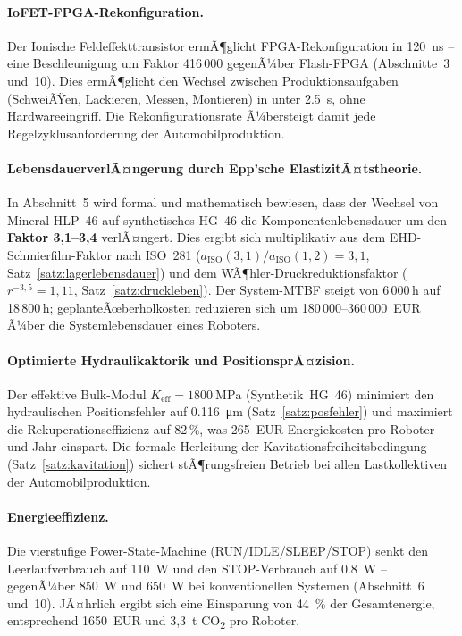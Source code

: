 ﻿\documentclass[a4paper,12pt]{scrreprt}
\theoremstyle{definition}
\begin{document}
\paragraph{IoFET-FPGA-Rekonfiguration.}
Der Ionische Feldeffekttransistor ermÃ¶glicht FPGA-Rekonfiguration
in \SI{120}{\nano\second} -- eine Beschleunigung um Faktor 416\,000
gegenÃ¼ber Flash-FPGA (Abschnitte~3 und~10). Dies ermÃ¶glicht den
Wechsel zwischen Produktionsaufgaben (SchweiÃŸen, Lackieren, Messen,
Montieren) in unter \SI{2.5}{\second}, ohne Hardwareeingriff.
Die Rekonfigurationsrate Ã¼bersteigt damit jede Regelzyklusanforderung
der Automobilproduktion.

\paragraph{LebensdauerverlÃ¤ngerung durch Epp'sche ElastizitÃ¤tstheorie.}
In Abschnitt~5 wird formal und mathematisch bewiesen, dass der Wechsel
von Mineral-HLP~46 auf synthetisches HG~46 die Komponentenlebensdauer
um den \textbf{Faktor 3{,}1--3{,}4} verlÃ¤ngert. Dies ergibt sich
multiplikativ aus dem EHD-Schmierfilm-Faktor nach ISO~281
($a_{\text{ISO}}(3{,}1)/a_{\text{ISO}}(1{,}2) = 3{,}1$,
Satz~\ref{satz:lagerlebensdauer}) und dem WÃ¶hler-Druckreduktionsfaktor
($r^{-3{,}5} = 1{,}11$, Satz~\ref{satz:druckleben}).
Der System-MTBF steigt von 6\,000\,h auf 18\,800\,h;
geplanteÃœberholkosten reduzieren sich um 180\,000--360\,000~EUR
Ã¼ber die Systemlebensdauer eines Roboters.

\paragraph{Optimierte Hydraulikaktorik und PositionsprÃ¤zision.}
Der effektive Bulk-Modul $K_{\text{eff}} = \SI{1800}{\mega\pascal}$
(Synthetik~HG~46) minimiert den hydraulischen Positionsfehler
auf \SI{0.116}{\micro\meter} (Satz~\ref{satz:posfehler}) und
maximiert die Rekuperationseffizienz auf 82\,\%, was 265~EUR
Energiekosten pro Roboter und Jahr einspart.
Die formale Herleitung der Kavitationsfreiheitsbedingung
(Satz~\ref{satz:kavitation}) sichert stÃ¶rungsfreien Betrieb
bei allen Lastkollektiven der Automobilproduktion.

\paragraph{Energieeffizienz.}
Die vierstufige Power-State-Machine (RUN/IDLE/SLEEP/STOP) senkt
den Leerlaufverbrauch auf \SI{110}{\watt} und den STOP-Verbrauch
auf \SI{0.8}{\watt} -- gegenÃ¼ber \SI{850}{\watt} und \SI{650}{\watt}
bei konventionellen Systemen (Abschnitt~6 und~10). JÃ¤hrlich ergibt
sich eine Einsparung von \SI{44}{\percent} der Gesamtenergie,
entsprechend 1650~EUR und 3{,}3~t CO\textsubscript{2} pro Roboter.
\end{document}
